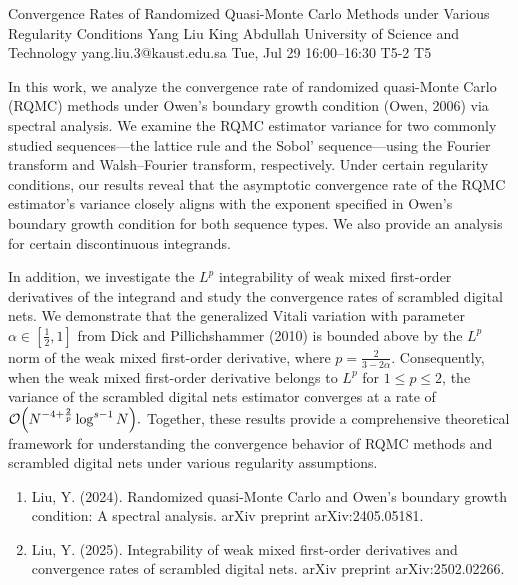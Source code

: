 \documentclass[12pt,lettersize,oneside]{book} %
\begin{document}
\begin{talk}
  {Convergence Rates of Randomized Quasi-Monte Carlo Methods under Various Regularity Conditions}%
  {Yang Liu}%
  {King Abdullah University of Science and Technology}%
  {yang.liu.3@kaust.edu.sa}%
  {}%
  {}%
  {Tue, Jul 29 16:00--16:30}%
  {T5-2}%
  {T5}%
  
    
        
        In this work, we analyze the convergence rate of randomized quasi-Monte Carlo (RQMC) methods under Owen's boundary growth condition (Owen, 2006) via spectral analysis. We examine the RQMC estimator variance for two commonly studied sequences—the lattice rule and the Sobol' sequence—using the Fourier transform and Walsh--Fourier transform, respectively. Under certain regularity conditions, our results reveal that the asymptotic convergence rate of the RQMC estimator's variance closely aligns with the exponent specified in Owen's boundary growth condition for both sequence types. We also provide an analysis for certain discontinuous integrands.

        In addition, we investigate the \(L^p\) integrability of weak mixed first-order derivatives of the integrand and study the convergence rates of scrambled digital nets. We demonstrate that the generalized Vitali variation with parameter \(\alpha \in \left[\frac{1}{2}, 1\right]\) from Dick and Pillichshammer (2010) is bounded above by the \(L^p\) norm of the weak mixed first-order derivative, where \(p = \frac{2}{3-2\alpha}\). Consequently, when the weak mixed first-order derivative belongs to \(L^p\) for \(1 \leq p \leq 2\), the variance of the scrambled digital nets estimator converges at a rate of
        \(
        \mathcal{O}\Bigl(N^{-4+\frac{2}{p}} \log^{s-1} N\Bigr).
        \)
        Together, these results provide a comprehensive theoretical framework for understanding the convergence behavior of RQMC methods and scrambled digital nets under various regularity assumptions.
        

\medskip

\begin{enumerate}
 \item[{[1]}] Liu, Y. (2024). Randomized quasi-Monte Carlo and Owen's boundary growth condition: A spectral analysis. arXiv preprint arXiv:2405.05181.
 \item[{[2]}] Liu, Y. (2025). Integrability of weak mixed first-order derivatives and convergence rates of scrambled digital nets. arXiv preprint arXiv:2502.02266.
\end{enumerate}


\end{talk}
\end{document}
